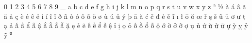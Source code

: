  
0
1
2
3
4
5
6
7
8
9
_
a
b
c
d
e
f
g
h
i
j
k
l
m
n
o
p
q
r
s
t
u
v
w
x
y
z
²
½
à
á
â
ã
ä
å
ç
è
é
ê
ë
ì
í
î
ï
ð
ñ
ò
ó
ô
õ
ö
ø
ù
ú
ü
ý
þ
ā
ă
ć
č
đ
ė
ě
ĩ
ı
ł
ō
ŏ
œ
ř
ş
š
ũ
ū
ơ
ư
ṭ
ạ
ả
ấ
ầ
ẩ
ẫ
ậ
ắ
ằ
ẳ
ẵ
ặ
ẹ
ẻ
ẽ
ế
ề
ể
ễ
ệ
ỉ
ị
ọ
ỏ
ố
ồ
ổ
ỗ
ộ
ớ
ờ
ở
ỡ
ợ
ụ
ủ
ứ
ừ
ử
ữ
ự
ỳ
ỵ
ỷ
ỹ
⁰
